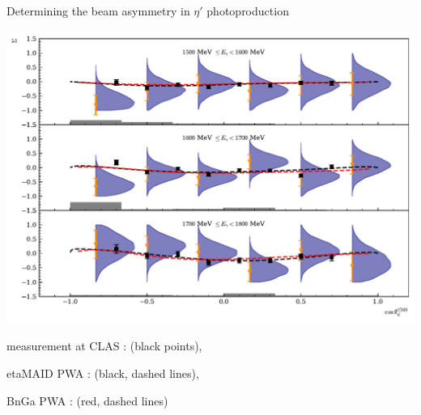 \documentclass[11pt,aspectratio=169,dvipsnames]{beamer}
\begin{document}
	\begin{frame}{Determining the beam asymmetry in $\eta'$ photoproduction}
		\begin{minipage}{.8\linewidth}
			\includegraphics[width=\linewidth]{../../bayes/etap_event_based_fit/plots/sigma_etap_pwa_data_talk.pdf}
		\end{minipage}
		\begin{minipage}{.19\linewidth}
			\begin{itemize}
				{\scriptsize\item measurement at CLAS \cites{collins}: (black points),
				\item etaMAID PWA \cites{etaMAID}: (black, dashed lines),
				\item BnGa PWA \cites{etap_bnga}: (red, dashed lines)}
			\end{itemize}
		\end{minipage}
	\end{frame}

	
	
	
\end{document}
